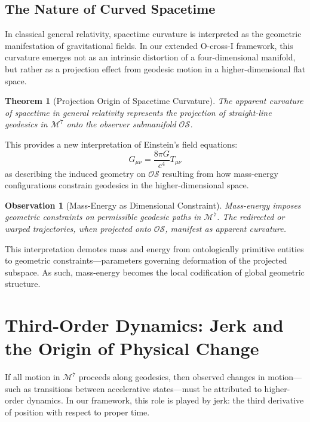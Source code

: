 \documentclass{article}
\newtheorem{theorem}{Theorem}
\newtheorem{observation}{Observation}
\begin{document}
\subsection{The Nature of Curved Spacetime}

In classical general relativity, spacetime curvature is interpreted as the geometric manifestation of gravitational fields. In our extended O-cross-I framework, this curvature emerges not as an intrinsic distortion of a four-dimensional manifold, but rather as a projection effect from geodesic motion in a higher-dimensional flat space.

\begin{theorem}[Projection Origin of Spacetime Curvature]
The apparent curvature of spacetime in general relativity represents the projection of straight-line geodesics in $\mathcal{M}^7$ onto the observer submanifold $\mathcal{OS}$.
\end{theorem}

This provides a new interpretation of Einstein's field equations:
\begin{equation}
G_{\mu\nu} = \frac{8\pi G}{c^4}T_{\mu\nu}
\end{equation}
as describing the induced geometry on $\mathcal{OS}$ resulting from how mass-energy configurations constrain geodesics in the higher-dimensional space.

\begin{observation}[Mass-Energy as Dimensional Constraint]
Mass-energy imposes geometric constraints on permissible geodesic paths in $\mathcal{M}^7$. The redirected or warped trajectories, when projected onto $\mathcal{OS}$, manifest as apparent curvature.
\end{observation}

This interpretation demotes mass and energy from ontologically primitive entities to geometric constraints—parameters governing deformation of the projected subspace. As such, mass-energy becomes the local codification of global geometric structure.

\section{Third-Order Dynamics: Jerk and the Origin of Physical Change}

If all motion in $\mathcal{M}^7$ proceeds along geodesics, then observed changes in motion—such as transitions between accelerative states—must be attributed to higher-order dynamics. In our framework, this role is played by jerk: the third derivative of position with respect to proper time.
\end{document}
